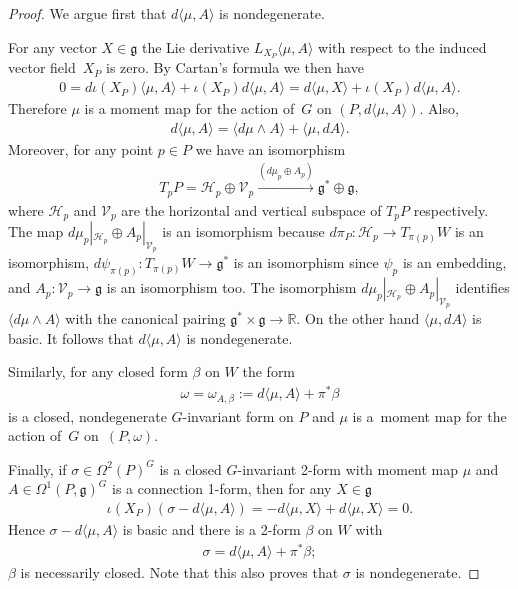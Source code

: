 \documentclass[10pt,a4paper]{amsart}
\numberwithin{equation}{section}
\begin{document}
\begin{proof}
  We argue f\/irst that $d \langle \mu, A\rangle$ is nondegenerate.

  For any vector $X\in {\mathfrak g}$ the Lie derivative $L_{X_P} \langle \mu,
  A\rangle$ with respect to the induced vector f\/ield~$X_P$ is zero.
  By Cartan's formula we then have
\begin{gather*}
0= d \iota(X_P)\langle  \mu, A\rangle
   +  \iota(X_P)d \langle  \mu, A\rangle =
   d \langle \mu, X\rangle + \iota(X_P)d \langle  \mu, A\rangle.
\end{gather*}
Therefore $\mu$ is a moment map for the action of~$G$
on $(P, d \langle \mu, A\rangle)$.  Also,
\begin{gather*}
d\langle \mu, A\rangle = \langle d\mu\wedge A\rangle + \langle \mu,
dA\rangle.
\end{gather*}
Moreover, for any point $p\in P$
we have an isomorphism
\begin{gather*}
T_pP ={\mathcal H}_p \oplus {\mathcal V}_p \xrightarrow{(d\mu_p\oplus A_p)} {\mathfrak g}^* \oplus {\mathfrak g},
\end{gather*}
where ${\mathcal H}_p$ and ${\mathcal V}_p$ are the horizontal and vertical subspace
of $T_pP$ respectively.
The map $d\mu_p|_{{\mathcal H}_p} \oplus
A_p|_{{\mathcal V}_p}$ is an isomorphism because $d\pi_P\colon {\mathcal H}_p \to
T_{\pi(p)}W$ is an isomorphism, $d\psi_{\pi(p)}\colon  T_{\pi(p)}W \to
{\mathfrak g}^*$ is an isomorphism since $\psi_p$ is an embedding,
and $A_p\colon {\mathcal V}_p\to {\mathfrak g}$ is an isomorphism too.  The isomorphism
$d\mu_p|_{{\mathcal H}_p} \oplus A_p|_{{\mathcal V}_p}$ identif\/ies $ \langle
d\mu\wedge A\rangle$ with the canonical pairing ${\mathfrak g}^*\times {\mathfrak g}\to
{\mathbb R}$. On the other hand $\langle \mu, dA\rangle$ is basic.  It follows
that $d\langle \mu, A\rangle $ is nondegenerate.

Similarly, for any closed form $\beta$ on $W$ the form
\begin{gather*}
\omega = \omega_{A,\beta}:= d\langle \mu, A\rangle +\pi^* \beta
\end{gather*}
is a closed, nondegenerate $G$-invariant form on $P$ and $\mu$ is a~moment map for the action of~$G$ on~$(P,\omega)$.

Finally, if $\sigma\in \Omega^2(P)^G$ is a closed $G$-invariant 2-form
with moment map $\mu$ and $A\in \Omega^1(P,{\mathfrak g})^G$ is a connection
1-form, then for any $X\in {\mathfrak g}$
\begin{gather*}
\iota(X_P)(\sigma - d\langle \mu, A\rangle) = -d \langle \mu, X\rangle
 + d \langle \mu, X\rangle = 0.
\end{gather*}
Hence $\sigma - d\langle \mu, A\rangle$ is basic and there is a 2-form
$\beta$ on $W$ with
\begin{gather*}
\sigma = d\langle \mu, A\rangle  + \pi^*\beta;
\end{gather*}
$\beta$ is necessarily closed.  Note that this also proves that $\sigma$ is nondegenerate.
\end{proof}
\end{document}
